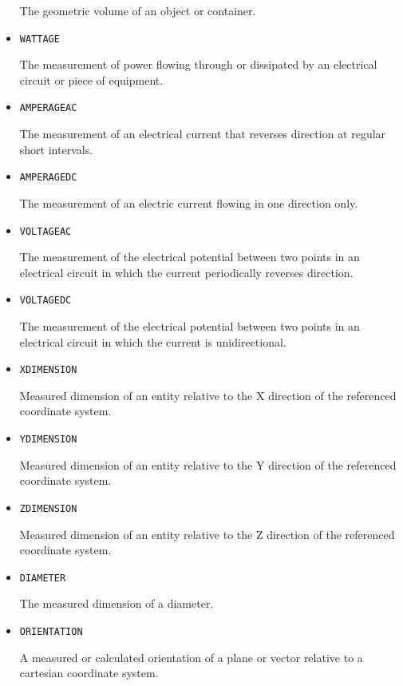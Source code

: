 \begin{itemize}
The geometric volume of an object or container.


\item \texttt{WATTAGE}  

The measurement of power flowing through or dissipated by an electrical circuit or piece of equipment.


\item \texttt{AMPERAGE\textunderscore AC}  

The measurement of an electrical current that reverses direction at regular short intervals.


\item \texttt{AMPERAGE\textunderscore DC}  

The measurement of an electric current flowing in one direction only.


\item \texttt{VOLTAGE\textunderscore AC}  

The measurement of the electrical potential between two points in an electrical circuit in which the current periodically reverses direction.


\item \texttt{VOLTAGE\textunderscore DC}  

The measurement of the electrical potential between two points in an electrical circuit in which the current is unidirectional.


\item \texttt{X\textunderscore DIMENSION}  

Measured dimension of an entity relative to the X direction of the referenced coordinate system.



\item \texttt{Y\textunderscore DIMENSION}  

Measured dimension of an entity relative to the Y direction of the referenced coordinate system.


\item \texttt{Z\textunderscore DIMENSION}  

Measured dimension of an entity relative to the Z direction of the referenced coordinate system.


\item \texttt{DIAMETER}  

The measured dimension of a diameter.


\item \texttt{ORIENTATION}  

A measured or calculated orientation of a plane or vector relative to a cartesian coordinate system.



\end{itemize}
